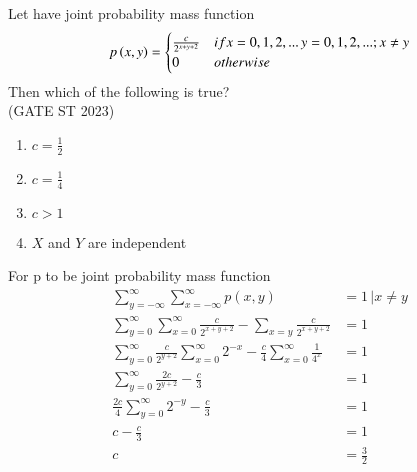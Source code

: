 \documentclass[journal,12pt,twocolumn]{IEEEtran}
\theoremstyle{remark}
\begin{document}
Let  have joint probability mass function 
\begin{align}
p\left(x,y\right)=  
	\begin{cases}
        \frac{c}{2^{x+y+2}} & if x=0,1,2,... \, y=0,1,2,...; x\neq y \\
        0 & otherwise
        \end{cases} 
\end{align} 
Then which of the following is true?\\
\hfill (GATE ST 2023) \\
\begin{enumerate}
\item $c = \frac{1}{2}$
\item $c = \frac{1}{4}$
\item $c > 1$
\item $X$ and $Y$ are independent
\end{enumerate}
\fi
\solution
For p to be joint probability mass function
\begin{align}
\sum\limits^{\infty}_{y=-\infty}\sum\limits^{\infty}_{x=-\infty}p(x,y)&=1 \, \vert x \neq y\\
\sum\limits^{\infty}_{y=0}\sum\limits^{\infty}_{x=0}\frac{c}{2^{x+y+2}}- \sum\limits_{x=y} \frac{c}{2^{x+y+2}}&=1\\
\sum\limits^{\infty}_{y=0}\frac{c}{2^{y+2}} \sum\limits^{\infty}_{x=0} 2^{-x}- \frac{c}{4}\sum\limits^{\infty}_{x=0}\frac{1}{4^x}&=1\\
\sum\limits^{\infty}_{y=0}\frac{2c}{2^{y+2}}- \frac{c}{3}&=1\\
\frac{2c}{4}\sum\limits^{\infty}_{y=0}2^{-y}-\frac{c}{3}&=1\\
c-\frac{c}{3}&=1\\
c&=\frac{3}{2}
\end{align}
\end{document}
